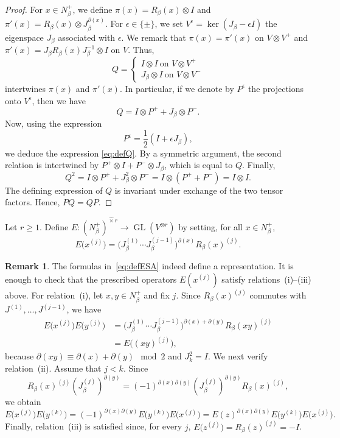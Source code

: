 \documentclass[reqno]{amsart}
\DeclareMathOperator{\GL}{GL}
\theoremstyle{definition}
\newtheorem{remark}[theorem]{Remark}
\begin{document}
\begin{proof}
For $x\in N_\beta^+$, we define $\pi(x)=R_\beta(x)\otimes I$ and
$\pi'(x)=R_\beta(x)\otimes J_\beta^{\partial(x)}$. For
$\epsilon\in\{\pm\}$, we set $V^{\epsilon}=\ker(J_\beta-\epsilon I)$ the
eigenspace $J_\beta$ associated with $\epsilon$. We remark that
$\pi(x)=\pi'(x)$ on $V\otimes V^+$ and $\pi'(x)=J_\beta R_\beta(x)
J_{\beta}^{-1}\otimes I$ on $V$. Thus, 
$$Q=\left\{\begin{array}{c}
I\otimes I \ \text{on } V\otimes V^+\\
J_\beta\otimes I\ \text{on } V\otimes V^-
\end{array}
\right.$$
intertwines $\pi(x)$ and $\pi'(x)$. In particular, if we denote by
$P^{\epsilon}$ the projections onto $V^\epsilon$, then we have
$$Q=I\otimes P^++J_\beta\otimes P^-.$$
Now, using the expression
\[
P^\epsilon=\frac12(I+\epsilon J_\beta),
\]
we deduce the expression \eqref{eq:defQ}.
By a symmetric argument, the second relation is intertwined by 
$P^+\otimes I + P^-\otimes J_\beta$, which is equal to $Q$.
Finally,
\[
Q^2
=
I\otimes P^+ + J_\beta^2\otimes P^-
=
I\otimes (P^++P^-)= I\otimes I.
\]
The defining expression of $Q$ is invariant under exchange of the two
tensor factors. Hence, $PQ=QP$.
\end{proof}

Let $r\geq 1$.
Define $E:(N_\beta^+)^{\widehat{\times} r}\longrightarrow \GL(V^{\otimes
r})$ by setting, for all $x\in N_\beta^+$,
\begin{equation}
\label{eq:defESA}
E\bigr(x^{(j)}\bigr)
=
\bigr(J_\beta^{(1)}
\cdots
J_\beta^{(j-1)}\bigr)^{\partial(x)}
R_\beta(x)^{(j)}. 
\end{equation}

\begin{remark}
The formulas in~\eqref{eq:defESA} indeed define a representation. It is enough to
check that the prescribed operators $E(x^{(j)})$ satisfy
relations~{(i)}--{(iii)} above.
For relation~{(i)}, let $x,y\in N_\beta^+$ and fix $j$. Since
$R_\beta(x)^{(j)}$ commutes with $J^{(1)},\ldots,J^{(j-1)}$, we have
\[
\begin{aligned}
E\bigr(x^{(j)}\bigr)E\bigr(y^{(j)}\bigr)
&=
\bigr(J_\beta^{(1)}\cdots J_\beta^{(j-1)}\bigr)^{\partial(x)+\partial(y)}
R_\beta(xy)^{(j)}\\
&=
E\bigr((xy)^{(j)}\bigr),
\end{aligned}
\]
because
$
\partial(xy)\equiv\partial(x)+\partial(y)\mod2
$
and $J_k^2=I$.
We next verify relation~{(ii)}. Assume that $j<k$.  Since
\[
R_\beta(x)^{(j)}(J_\beta^{(j)})^{\partial(y)}
=
(-1)^{\partial(x)\partial(y)}
(J_\beta^{(j)})^{\partial(y)}R_\beta(x)^{(j)},
\]
we obtain
\[
E\bigr(x^{(j)}\bigr)E\bigr(y^{(k)}\bigr)
=
(-1)^{\partial(x)\partial(y)}
E\bigr(y^{(k)}\bigr)E\bigr(x^{(j)}\bigr) 
=
E(z)^{\partial(x)\partial(y)}
E\bigr(y^{(k)}\bigr)E\bigr(x^{(j)}\bigr).
\]
Finally, relation~{(iii)} is satisfied since, for every $j$, $
E\bigr(z^{(j)}\bigr)
= R_\beta(z)^{(j)} = -I $.
\end{remark}
\end{document}
